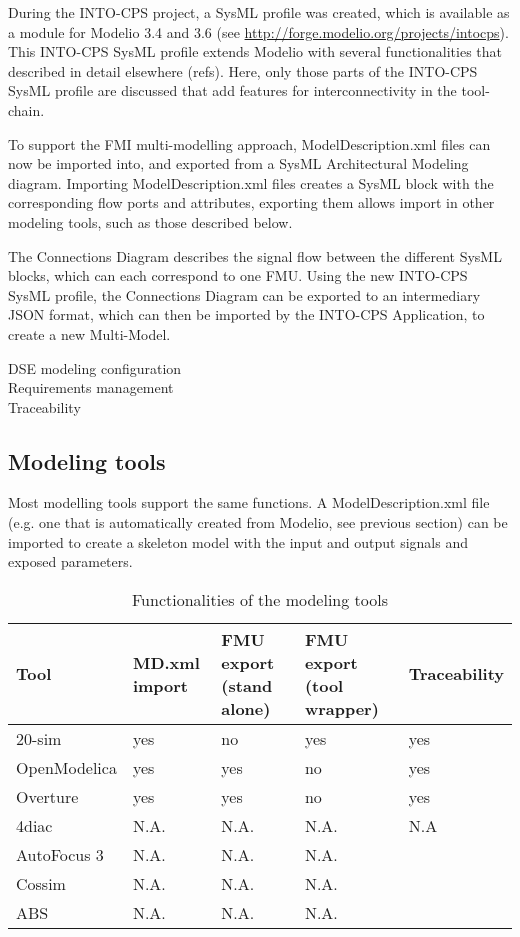 During the INTO-CPS project, a SysML profile was created, which is available as a module for Modelio 3.4 and 3.6 (see \url{http://forge.modelio.org/projects/intocps}). This INTO-CPS SysML profile extends Modelio with several functionalities that described in detail elsewhere (refs). Here, only those parts of the INTO-CPS SysML profile are discussed that add features for interconnectivity in the tool-chain.

To support the FMI multi-modelling approach, ModelDescription.xml files can now be imported into, and exported from a SysML Architectural Modeling diagram. Importing ModelDescription.xml files creates a SysML block with the corresponding flow ports and attributes, exporting them allows import in other modeling tools, such as those described below.

The Connections Diagram describes the signal flow between the different SysML blocks, which can each correspond to one FMU. Using the new INTO-CPS SysML profile, the Connections Diagram can be exported to an intermediary JSON format, which can then be imported by the INTO-CPS Application, to create a new Multi-Model.

DSE modeling configuration\\
Requirements management\\
Traceability\\

\subsection{Modeling tools}

Most modelling tools support the same functions. A ModelDescription.xml file (e.g. one that is automatically created from Modelio, see previous section) can be imported to create a skeleton model with the input and output signals and exposed parameters. 


\begin{table*}[ht]
	\centering
		\begin{tabular}{l|p{3cm}|p{3cm}|p{3cm}|p{3cm}}
			Tool & MD.xml import & FMU export (stand alone) & FMU export (tool wrapper) & Traceability\\
			\hline
			20-sim & yes & no & yes & yes\\
			OpenModelica & yes & yes & no & yes\\
			Overture & yes & yes & no & yes\\
			4diac & N.A. & N.A. & N.A. & N.A \\
			AutoFocus 3 & N.A. & N.A. & N.A. \\
			Cossim & N.A. & N.A. & N.A. \\
			ABS & N.A. & N.A. & N.A. \\
		\end{tabular}
	\caption{Functionalities of the modeling tools}
	\label{tab:FunctionalitiesOfTheModelingTools}
\end{table*}

